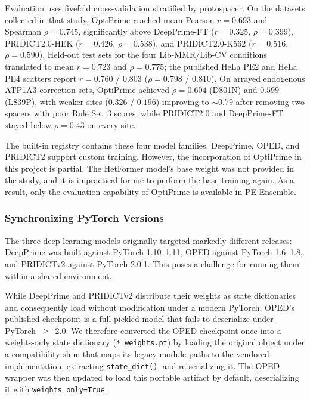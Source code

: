 \documentclass{article}
\begin{document}
\begin{enumerate}
    Evaluation uses fivefold cross-validation stratified by protospacer. On the datasets collected in that study, OptiPrime reached mean Pearson $r = 0.693$ and Spearman $\rho = 0.745$, significantly above DeepPrime-FT ($r = 0.325$, $\rho = 0.399$), PRIDICT2.0-HEK ($r = 0.426$, $\rho = 0.538$), and PRIDICT2.0-K562 ($r = 0.516$, $\rho = 0.590$). Held-out test sets for the four Lib-MMR/Lib-CV conditions translated to mean $r = 0.723$ and $\rho = 0.775$; the published HeLa PE2 and HeLa PE4 scatters report $r = 0.760$ / $0.803$ ($\rho = 0.798$ / $0.810$). On arrayed endogenous ATP1A3 correction sets, OptiPrime achieved $\rho = 0.604$ (D801N) and $0.599$ (L839P), with weaker sites ($0.326$ / $0.196$) improving to ${\sim}0.79$ after removing two spacers with poor Rule Set~3 scores, while PRIDICT2.0 and DeepPrime-FT stayed below $\rho = 0.43$ on every site. 
\end{enumerate}

The built-in registry contains these four model families. DeepPrime, OPED, and PRIDICT2 support custom training. However, the incorporation of OptiPrime in this project is partial. The HetFormer model's base weight was not provided in the study, and it is impractical for me to perform the base training again. As a result, only the evaluation capability of OptiPrime is available in PE-Ensemble.

\subsubsection{Synchronizing PyTorch Versions}

The three deep learning models originally targeted markedly different releases: DeepPrime\cite{yuPredictionEfficienciesDiverse2023} was built against PyTorch 1.10--1.11, OPED\cite{liuDesignPrimeeditingGuide2023} against PyTorch 1.6--1.8, and PRIDICTv2\cite{mathisMachineLearningPrediction2024} against PyTorch 2.0.1. This poses a challenge for running them within a shared environment.

While DeepPrime and PRIDICTv2 distribute their weights as state dictionaries and consequently load without modification under a modern PyTorch, OPED's published checkpoint is a full pickled model that fails to deserialize under PyTorch~$\geq$~2.0. We therefore converted the OPED checkpoint once into a weights-only state dictionary (\nolinkurl{*\_weights.pt}) by loading the original object under a compatibility shim that maps its legacy module paths to the vendored implementation, extracting \nolinkurl{state\_dict()}, and re-serializing it. The OPED wrapper was then updated to load this portable artifact by default, deserializing it with \nolinkurl{weights\_only=True}.
\end{document}
